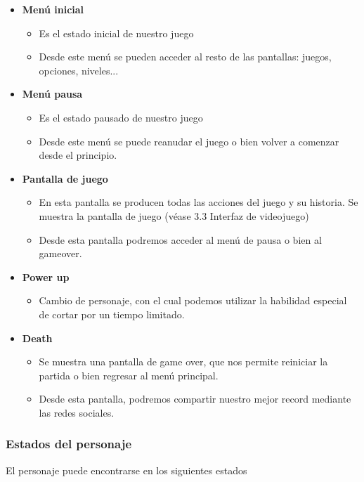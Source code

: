 \documentclass[palatino]{apuntes}
\begin{document}
\begin{itemize}
    \item \textbf{Menú inicial}
        \begin{itemize}
            \item Es el estado inicial de nuestro juego
            \item Desde este menú se pueden acceder al resto de las pantallas: juegos, opciones, niveles...
        \end{itemize}
    \item \textbf{Menú pausa}
        \begin{itemize}
            \item Es el estado pausado de nuestro juego
            \item Desde este menú se puede reanudar el juego o bien volver a comenzar desde el principio.
        \end{itemize}
    \item \textbf{Pantalla de juego}
        \begin{itemize}
            \item En esta pantalla se producen todas las acciones del juego y su historia. Se muestra la pantalla de juego (véase 3.3 Interfaz de videojuego)
	    \item Desde esta pantalla podremos acceder al menú de pausa o bien al gameover.
        \end{itemize}

   \item \textbf{Power up}
        \begin{itemize}
            \item Cambio de personaje, con el cual podemos utilizar la habilidad especial de cortar por un tiempo limitado.
        \end{itemize}
    
    \item \textbf{Death}
        \begin{itemize}
            \item Se muestra una pantalla de game over, que nos permite reiniciar la partida o bien regresar al menú principal.
            \item Desde esta pantalla, podremos compartir nuestro mejor record mediante las redes sociales.
        \end{itemize}
            
\end{itemize}


\subsubsection{Estados del personaje}
El personaje puede encontrarse en los siguientes estados
\end{document}
